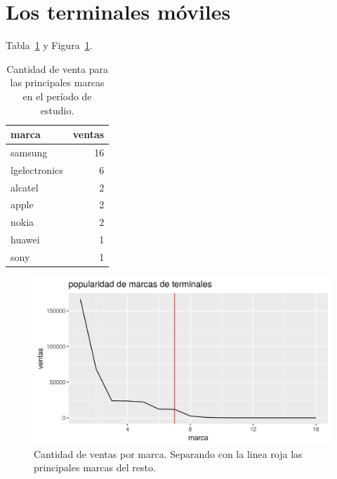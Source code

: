 \lipsum[1-2] %


\section{Los terminales móviles}
\label{sec:terminales}

\lipsum[1-3] %
Tabla~\ref{tab:marcas_top} y Figura~\ref{fig:marcas}.


\begin{table}[ht]
\centering
\begin{tabular}{lr}
  \hline
marca & ventas \\ 
  \hline
samsung & 16 \\ 
  lgelectronics & 6 \\ 
  alcatel & 2 \\ 
  apple & 2 \\ 
  nokia & 2 \\ 
  huawei & 1 \\ 
  sony & 1 \\ 
   \hline
\end{tabular}
\caption{Cantidad de venta para las principales marcas en el período de estudio.} 
\label{tab:marcas_top}
\end{table}


\begin{figure}[bhtp]
\begin{center}
\includegraphics[scale=0.6]{figures/ejemplo.png}
\caption{Cantidad de ventas por marca. Separando con la linea roja las principales marcas del resto.}
\label{fig:marcas}
\end{center}
\end{figure}




